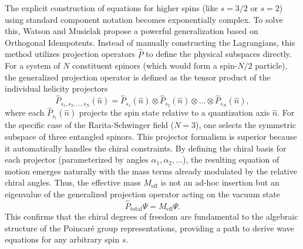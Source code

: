 The explicit construction of equations for higher spins (like $s=3/2$ or $s=2$)
using standard component notation becomes exponentially complex. To solve this,
Watson and Musielak propose a powerful generalization based on Orthogonal
Idempotents. Instead of manually constructing the Lagrangians, this method
utilizes projection operators $\hat{P}$ to define the physical subspaces
directly. For a system of $N$ constituent spinors (which would form a spin-$N/2$
particle), the generalized projection operator is defined as the tensor product
of the individual helicity projectors
\begin{equation}
  \hat{P}_{s_1, s_2, \dots, s_N}\left(\hat{n}\right) =
  \hat{P}_{s_1}\left(\hat{n}\right) \otimes \hat{P}_{s_2}\left(\hat{n}\right)
  \otimes \dots \otimes \hat{P}_{s_N}\left(\hat{n}\right),
\end{equation}
where each $\hat{P}_{s_i}\left(\hat{n}\right)$ projects the spin state relative
to a quantization axis $\hat{n}$. For the specific case of the Rarita-Schwinger
field ($N=3$), one selects the symmetric subspace of three entangled spinors.
This projector formalism is superior because it automatically handles the chiral
constraints. By defining the chiral basis for each projector (parameterized by
angles $\alpha_1, \alpha_2, \dots$), the resulting equation of motion emerges
naturally with the mass terms already modulated by the relative chiral angles.
Thus, the effective mass $M_{\text{eff}}$ is not an ad-hoc insertion but an
eigenvalue of the generalized projection operator acting on the vacuum state
\begin{equation}
  \hat{P}_{\text{total}} \Psi = M_{\text{eff}} \Psi.
\end{equation}
This confirms that the chiral degrees of freedom are fundamental to the
algebraic structure of the Poincar\'{e} group representations, providing a
path to derive wave equations for any arbitrary spin $s$.

